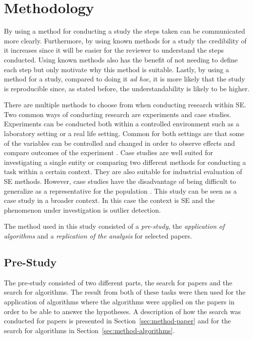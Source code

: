 ﻿\section{Methodology}
\label{sec:methodology}
By using a method for conducting a study the steps taken can be communicated more clearly. Furthermore, by using known methods for a study the credibility of it increases since it will be easier for the reviewer to understand the steps conducted. Using known methods also has the benefit of not needing to define each step but only motivate why this method is suitable. Lastly, by using a method for a study, compared to doing it \emph{ad hoc}, it is more likely that the study is reproducible since, as stated before, the understandability is likely to be higher.


There are multiple methods to choose from when conducting research within SE. Two common ways of conducting research are experiments and case studies. Experiments can be conducted both within a controlled environment such as a laboratory setting or a real life setting. Common for both settings are that some of the variables can be controlled and changed in order to observe effects and compare outcomes of the experiment \citep{wohlin2012experimentation}. Case studies are well suited for investigating a single entity or comparing two different methods for conducting a task within a certain context. They are also suitable for industrial evaluation of SE methods. However, case studies have the disadvantage of being difficult to generalize as a representative for the population \citep{runeson2009guidelines}. This study can be seen as a case study in a broader context. In this case the context is SE and the phenomenon under investigation is outlier detection.




The method used in this study consisted of a \emph{pre-study}, the \emph{application of algorithms} and a \emph{replication of the analysis} for selected papers.




\subsection{Pre-Study}
The pre-study consisted of two different parts, the search for papers and the search for algorithms. The result from both of these tasks were then used for the application of algorithms where the algorithms were applied on the papers in order to be able to answer the hypotheses. A description of how the search was conducted for papers is presented in Section~\ref{sec:method-paper} and for the search for algorithms in Section~\ref{sec:method-algorithms}.




